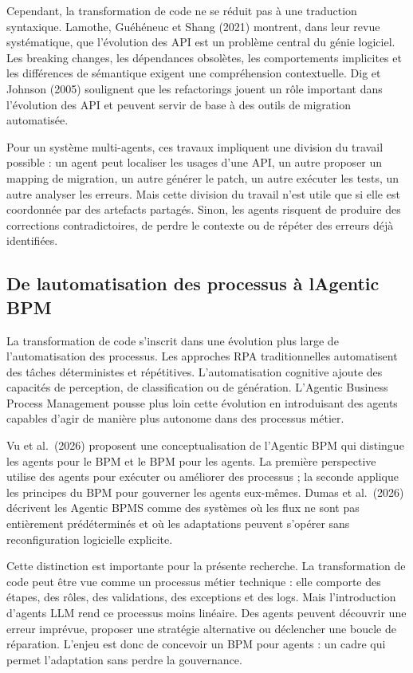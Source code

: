 Cependant, la transformation de code ne se réduit pas à une traduction syntaxique. Lamothe, Guéhéneuc et Shang (2021) montrent, dans leur revue systématique, que l'évolution des API est un problème central du génie logiciel. Les breaking changes, les dépendances obsolètes, les comportements implicites et les différences de sémantique exigent une compréhension contextuelle. Dig et Johnson (2005) soulignent que les refactorings jouent un rôle important dans l'évolution des API et peuvent servir de base à des outils de migration automatisée.

Pour un système multi-agents, ces travaux impliquent une division du travail possible : un agent peut localiser les usages d'une API, un autre proposer un mapping de migration, un autre générer le patch, un autre exécuter les tests, un autre analyser les erreurs. Mais cette division du travail n'est utile que si elle est coordonnée par des artefacts partagés. Sinon, les agents risquent de produire des corrections contradictoires, de perdre le contexte ou de répéter des erreurs déjà identifiées.

\subsection{De l\textquotesingle automatisation des processus \`a l\textquotesingle Agentic BPM}

La transformation de code s'inscrit dans une évolution plus large de l'automatisation des processus. Les approches RPA traditionnelles automatisent des tâches déterministes et répétitives. L'automatisation cognitive ajoute des capacités de perception, de classification ou de génération. L'Agentic Business Process Management pousse plus loin cette évolution en introduisant des agents capables d'agir de manière plus autonome dans des processus métier.

Vu et al.~(2026) proposent une conceptualisation de l'Agentic BPM qui distingue les agents pour le BPM et le BPM pour les agents. La première perspective utilise des agents pour exécuter ou améliorer des processus ; la seconde applique les principes du BPM pour gouverner les agents eux-mêmes. Dumas et al.~(2026) décrivent les Agentic BPMS comme des systèmes où les flux ne sont pas entièrement prédéterminés et où les adaptations peuvent s'opérer sans reconfiguration logicielle explicite.

Cette distinction est importante pour la présente recherche. La transformation de code peut être vue comme un processus métier technique : elle comporte des étapes, des rôles, des validations, des exceptions et des logs. Mais l'introduction d'agents LLM rend ce processus moins linéaire. Des agents peuvent découvrir une erreur imprévue, proposer une stratégie alternative ou déclencher une boucle de réparation. L'enjeu est donc de concevoir un BPM pour agents : un cadre qui permet l'adaptation sans perdre la gouvernance.

